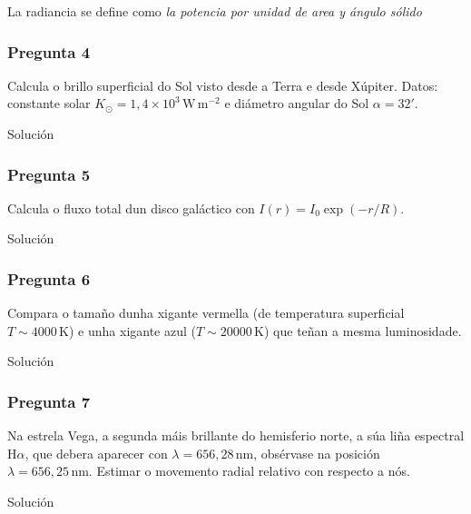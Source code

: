 La radiancia se define como \textit{la potencia por unidad de area y ángulo sólido} 

\vspace*{2em}

\begin{Enunciado}
	\subsubsection{Pregunta 4}

	Calcula o brillo superficial do Sol visto desde a Terra e desde Xúpiter. Datos: constante solar $K_\odot = 1{,}4 \times 10^3\,\text{W}\,\text{m}^{-2}$ e diámetro angular do Sol $\alpha = 32'$.

\end{Enunciado}
Solución

\vspace*{2em}

\begin{Enunciado}
	\subsubsection{Pregunta 5}

	Calcula o fluxo total dun disco galáctico con $I(r) = I_0 \exp(-r/R)$.

\end{Enunciado}
Solución


\vspace*{2em}

\begin{Enunciado}
	\subsubsection{Pregunta 6}

	Compara o tamaño dunha xigante vermella (de temperatura superficial $T \sim 4000\,\text{K}$) e unha xigante azul ($T \sim 20000\,\text{K}$) que teñan a mesma luminosidade.

\end{Enunciado}
Solución

\vspace*{2em}

\begin{Enunciado}
	\subsubsection{Pregunta 7}

	Na estrela Vega, a segunda máis brillante do hemisferio norte, a súa liña espectral H$\alpha$, que debera aparecer con $\lambda = 656{,}28\,\text{nm}$, obsérvase na posición $\lambda = 656{,}25\,\text{nm}$. Estimar o movemento radial relativo con respecto a nós.

\end{Enunciado}
Solución

